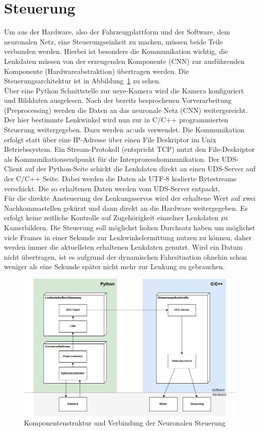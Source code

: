 \newpage

\section{Steuerung}

Um aus der Hardware, also der Fahrzeugplattform und der Software, dem neuronalen Netz, eine Steuerungseinheit zu machen, müssen beide Teile verbunden werden. Hierbei ist besonders die Kommunikation wichtig, die Lenkdaten müssen von der erzeugenden Komponente (CNN) zur ausführenden Komponente (Hardwareabstraktion) übertragen werden. Die Steuerungsarchitektur ist in Abbildung~\ref{fig:steuerung} zu sehen.\\
Über eine Python Schnittstelle zur ueye-Kamera wird die Kamera konfiguriert und Bilddaten ausgelesen. Nach der bereits besprochenen Vorverarbeitung (Preprocessing) werden die Daten an das neuronale Netz (CNN) weitergereicht.\\ 
Der hier bestimmte Lenkwinkel wird nun zur in C/C++ programmierten Steuerung weitergegeben. Dazu werden \gls{ac:uds} verwendet. Die Kommunikation erfolgt statt über eine IP-Adresse über einen File Deskriptor im Unix Betriebssystem. Ein Stream-Protokoll (entspricht TCP) nutzt den File-Deskriptor als Kommunikationsendpunkt für die Interprozesskommunikation. Der UDS-Client auf der Python-Seite schickt die Lenkdaten direkt an einen UDS-Server auf der C/C++ Seite. Dabei werden die Daten als UTF-8 kodierte Bytestreams verschickt. Die so erhaltenen Daten werden vom UDS-Server entpackt.\\
Für die direkte Ansteuerung des Lenkungsservos wird der erhaltene Wert auf zwei Nachkommastellen gekürzt und dann direkt an die Hardware weitergegeben. Es erfolgt keine zeitliche Kontrolle auf Zugehörigkeit einzelner Lenkdaten zu Kamerbildern. Die Steuerung soll möglichst hohen Durchsatz haben um möglichst viele Frames in einer Sekunde zur Lenkwinkelermittung nutzen zu können, daher werden immer die aktuellsten erhaltenen Lenkdaten genutzt. Wird ein Datum nicht übertragen, ist es aufgrund der dynamischen Fahrsituation ohnehin schon weniger als eine Sekunde später nicht mehr zur Lenkung zu gebrauchen.

\begin{figure}[h]
	\centering
	\includegraphics[width=1\linewidth]{figures/Steuerung.png}
	\caption{Komponentenstruktur und Verbindung der Neuronalen Steuerung}
	\label{fig:steuerung}
\end{figure}

